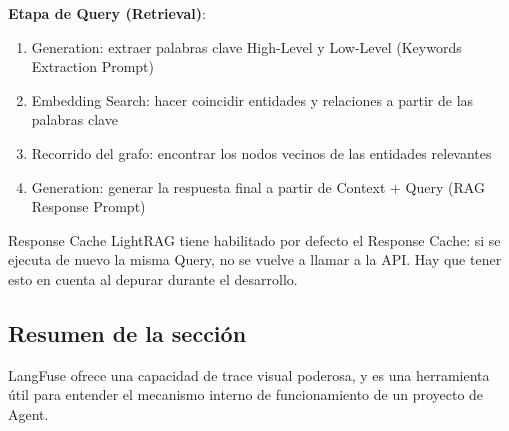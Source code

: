 \textbf{Etapa de Query (Retrieval)}:
\begin{enumerate}
    \item Generation: extraer palabras clave High-Level y Low-Level (Keywords Extraction Prompt)
    \item Embedding Search: hacer coincidir entidades y relaciones a partir de las palabras clave
    \item Recorrido del grafo: encontrar los nodos vecinos de las entidades relevantes
    \item Generation: generar la respuesta final a partir de Context + Query (RAG Response Prompt)
\end{enumerate}

\begin{warningbox}{Response Cache}
LightRAG tiene habilitado por defecto el Response Cache: si se ejecuta de nuevo la misma Query, no se vuelve a llamar a la API. Hay que tener esto en cuenta al depurar durante el desarrollo.
\end{warningbox}

\subsection{Resumen de la sección}

LangFuse ofrece una capacidad de trace visual poderosa, y es una herramienta útil para entender el mecanismo interno de funcionamiento de un proyecto de Agent.

